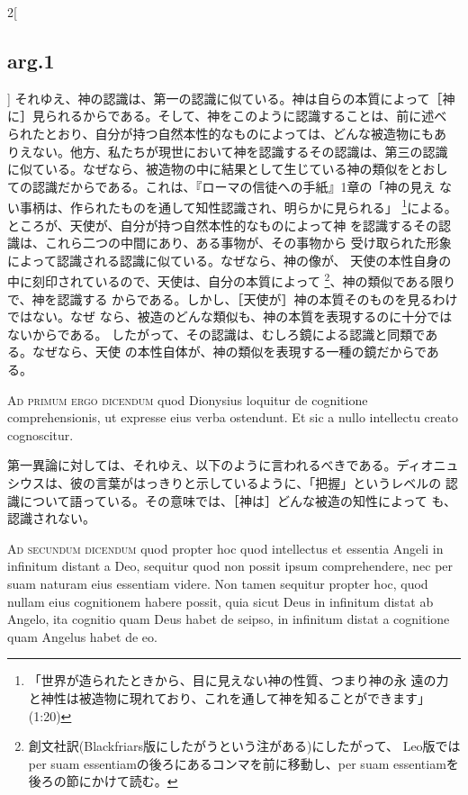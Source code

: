 \documentclass[paper=a4paper,fontsize=10pt,jafontsize=9pt,titlepage]{jlreq}
\begin{document}
\begin{paracol}{2}[\subsection{arg.1}]
それゆえ、神の認識は、第一の認識に似ている。神は自らの本質によって［神
に］見られるからである。そして、神をこのように認識することは、前に述べ
られたとおり、自分が持つ自然本性的なものによっては、どんな被造物にもあ
りえない。他方、私たちが現世において神を認識するその認識は、第三の認識
に似ている。なぜなら、被造物の中に結果として生じている神の類似をとおし
ての認識だからである。これは、『ローマの信徒への手紙』1章の「神の見え
ない事柄は、作られたものを通して知性認識され、明らかに見られる」
\footnote{「世界が造られたときから、目に見えない神の性質、つまり神の永
遠の力と神性は被造物に現れており、これを通して神を知ることができます」
(1:20)}による。ところが、天使が、自分が持つ自然本性的なものによって神
を認識するその認識は、これら二つの中間にあり、ある事物が、その事物から
受け取られた形象によって認識される認識に似ている。なぜなら、神の像が、
天使の本性自身の中に刻印されているので、天使は、自分の本質によって
\footnote{創文社訳(Blackfriars版にしたがうという注がある)にしたがって、
Leo版ではper suam essentiamの後ろにあるコンマを前に移動し、per suam
essentiamを後ろの節にかけて読む。}、神の類似である限りで、神を認識する
からである。しかし、［天使が］神の本質そのものを見るわけではない。なぜ
なら、被造のどんな類似も、神の本質を表現するのに十分ではないからである。
したがって、その認識は、むしろ鏡による認識と同類である。なぜなら、天使
の本性自体が、神の類似を表現する一種の鏡だからである。

\switchcolumn*[\subsection{ad.1}]

{\scshape Ad primum ergo dicendum} quod Dionysius loquitur de
cognitione comprehensionis, ut expresse eius verba ostendunt. Et sic a
nullo intellectu creato cognoscitur.

\switchcolumn

第一異論に対しては、それゆえ、以下のように言われるべきである。ディオニュ
シウスは、彼の言葉がはっきりと示しているように、「把握」というレベルの
認識について語っている。その意味では、［神は］どんな被造の知性によって
も、認識されない。

\switchcolumn*[\subsection{ad.2}]

{\scshape Ad secundum dicendum} quod propter hoc quod intellectus et
essentia Angeli in infinitum distant a Deo, sequitur quod non possit
ipsum comprehendere, nec per suam naturam eius essentiam videre. Non
tamen sequitur propter hoc, quod nullam eius cognitionem habere
possit, quia sicut Deus in infinitum distat ab Angelo, ita cognitio
quam Deus habet de seipso, in infinitum distat a cognitione quam
Angelus habet de eo.


\end{paracol}
\end{document}
